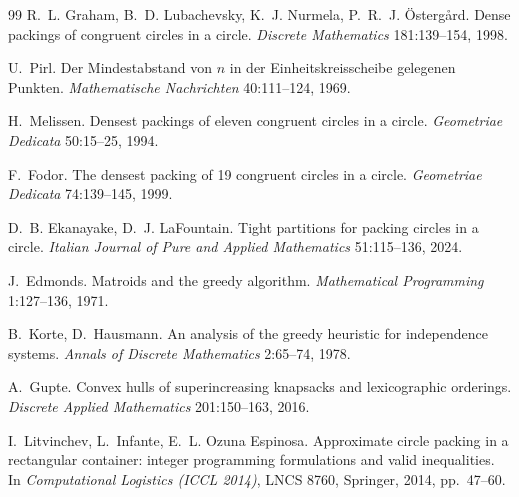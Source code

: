 \documentclass[11pt]{article}
\theoremstyle{definition}
\begin{document}
\begin{thebibliography}{99}
R.~L. Graham, B.~D. Lubachevsky, K.~J. Nurmela, P.~R.~J. \"Osterg\aa rd.
Dense packings of congruent circles in a circle.
\emph{Discrete Mathematics} 181:139--154, 1998.

U.~Pirl.
Der Mindestabstand von $n$ in der Einheitskreisscheibe gelegenen Punkten.
\emph{Mathematische Nachrichten} 40:111--124, 1969.

H.~Melissen.
Densest packings of eleven congruent circles in a circle.
\emph{Geometriae Dedicata} 50:15--25, 1994.

F.~Fodor.
The densest packing of 19 congruent circles in a circle.
\emph{Geometriae Dedicata} 74:139--145, 1999.

D.~B. Ekanayake, D.~J. LaFountain.
Tight partitions for packing circles in a circle.
\emph{Italian Journal of Pure and Applied Mathematics} 51:115--136, 2024.

J.~Edmonds.
Matroids and the greedy algorithm.
\emph{Mathematical Programming} 1:127--136, 1971.

B.~Korte, D.~Hausmann.
An analysis of the greedy heuristic for independence systems.
\emph{Annals of Discrete Mathematics} 2:65--74, 1978.

A.~Gupte.
Convex hulls of superincreasing knapsacks and lexicographic orderings.
\emph{Discrete Applied Mathematics} 201:150--163, 2016.

I.~Litvinchev, L.~Infante, E.~L. Ozuna Espinosa.
Approximate circle packing in a rectangular container: integer programming
formulations and valid inequalities.
In \emph{Computational Logistics (ICCL 2014)}, LNCS 8760, Springer, 2014,
pp.\ 47--60.

\end{thebibliography}
\end{document}
